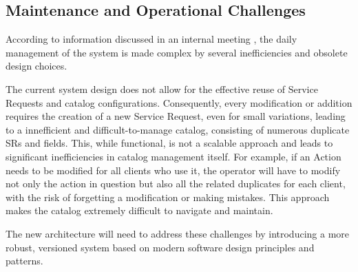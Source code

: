 \subsection{Maintenance and Operational Challenges}

According to information discussed in an internal meeting \cite{requirements_meeting}, the daily management of the system is made complex by several inefficiencies and obsolete design choices.

The current system design does not allow for the effective reuse of Service Requests and catalog configurations. Consequently, every modification or addition requires the creation of a new Service Request, even for small variations, leading to a innefficient and difficult-to-manage catalog, consisting of numerous duplicate SRs and fields. This, while functional, is not a scalable approach and leads to significant inefficiencies in catalog management itself. For example, if an Action needs to be modified for all clients who use it, the operator will have to modify not only the action in question but also all the related duplicates for each client, with the risk of forgetting a modification or making mistakes. This approach makes the catalog extremely difficult to navigate and maintain.

The new architecture will need to address these challenges by introducing a more robust, versioned system based on modern software design principles and patterns.